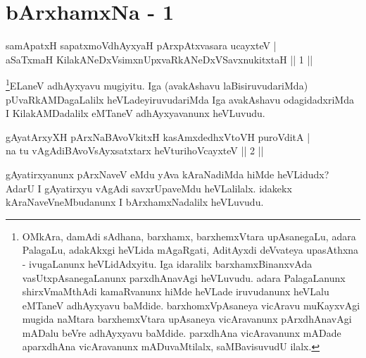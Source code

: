 \chapter{bArxhamxNa - 1}



\begin{shl}
samApatxH sapatxmoV\s dhAyxyaH pArxpAtxvasara ucayxteV | \\
aSaTxmaH KilakANeDxV\s simxnUpxvaRkANeDxVSavxnukitxtaH \hfill|| 1 || 
\end{shl}

\begin{artha} 
\footnote{OMkAra, damAdi sAdhana, barxhamx, barxhemxVtara 
upAsanegaLu, adara PalagaLu, adakAkxgi heVLida mAgaRgati, AditAyxdi 
deVvateya upasAthxna - ivugaLanunx heVLidAdxyitu. Iga idaralilx 
barxhamxBinanxvAda vasUtxpAsanegaLanunx parxdhAnavAgi heVLuvudu. adara 
PalagaLanunx shirxVmaMthAdi kamaRvanunx hiMde heVLade iruvudanunx heVLalu 
eMTaneV adhAyxyavu baMdide. barxhomxVpAsaneya vicAravu muKayxvAgi 
mugida naMtara barxhemxVtara upAsaneya vicAravanunx pArxdhAnavAgi 
mADalu beVre adhAyxyavu baMdide. parxdhAna vicAravanunx mADade 
aparxdhAna vicAravanunx mADuvaMtilalx, saMBavisuvudU ilalx.}ELaneV adhAyxyavu mugiyitu. Iga (avakAshavu 
laBisiruvudariMda) pUvaRkAMDagaLalilx heVLadeyiruvudariMda Iga 
avakAshavu odagidadxriMda I KilakAMDadalilx eMTaneV adhAyxyavanunx 
heVLuvudu.
\end{artha}


\begin{shl}
gAyatArxyXH pArxNaBAvoVkitxH kasAmxdedhxVtoVH puroVditA | \\
na tu vAgAdiBAvoV\s sAyxsatxtarx heVturihoVcayxteV \hfill|| 2 || 
\end{shl}

\begin{artha} 
gAyatirxyanunx pArxNaveV eMdu yAva kAraNadiMda hiMde heVLidudx? AdarU 
I gAyatirxyu vAgAdi savxrUpaveMdu heVLalilalx. idakekx 
kAraNaveVneMbudanunx I bArxhamxNadalilx heVLuvudu.
\end{artha}

